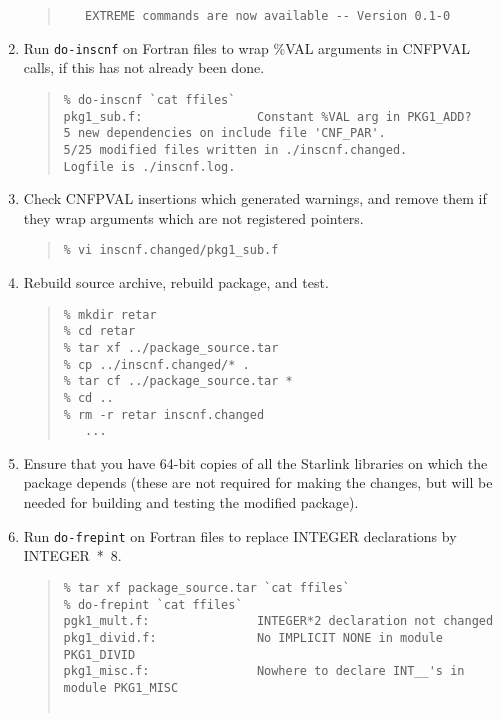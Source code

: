 \documentclass[twoside,11pt]{article}
\newcommand{\htmlref}[2]{#1}
\newcommand{\html}[1]{}
\renewcommand{\_}{\texttt{\symbol{95}}}
\newcommand{\xdofilter}[1]{\htmlref{{\tt do-#1}}{do-xxx}}
\newenvironment{squote}{\begin{quote}\begin{small}}{\end{small}\end{quote}}
\begin{document}
\begin{enumerate}
\begin{squote}
\begin{verbatim}
   EXTREME commands are now available -- Version 0.1-0
\end{verbatim}
\end{squote}
%
\item
Run \xdofilter{inscnf} on Fortran files
to wrap \%VAL arguments in CNF\_PVAL calls,
if this has not already been done.
\begin{squote}
\begin{verbatim}
% do-inscnf `cat ffiles`
pkg1_sub.f:                Constant %VAL arg in PKG1_ADD?
5 new dependencies on include file 'CNF_PAR'.
5/25 modified files written in ./inscnf.changed.
Logfile is ./inscnf.log.
\end{verbatim}
\end{squote}
%
\item
Check CNF\_PVAL insertions which generated warnings,
and remove them if they wrap arguments which are not registered pointers.
\begin{squote}
\begin{verbatim}
% vi inscnf.changed/pkg1_sub.f
\end{verbatim}
\end{squote}
%
\item
Rebuild source archive, rebuild package, and test.
\begin{squote}
\begin{verbatim}
% mkdir retar
% cd retar
% tar xf ../package_source.tar
% cp ../inscnf.changed/* .
% tar cf ../package_source.tar *
% cd ..
% rm -r retar inscnf.changed
   ...
\end{verbatim}
\end{squote}
%
\item
Ensure that you have 64-bit copies of all the Starlink libraries on which the
package depends (these are not required for making the changes, but
will be needed for building and testing the modified package).
\html{\begin{squote}\end{squote}}
\item
Run \xdofilter{frepint} on Fortran files to replace INTEGER declarations
by INTEGER~*~8.
\begin{squote}
\begin{verbatim}
% tar xf package_source.tar `cat ffiles`
% do-frepint `cat ffiles`
pgk1_mult.f:               INTEGER*2 declaration not changed
pkg1_divid.f:              No IMPLICIT NONE in module PKG1_DIVID
pkg1_misc.f:               Nowhere to declare INT__'s in module PKG1_MISC


\end{verbatim}
\end{squote}
\end{enumerate}
\end{document}
